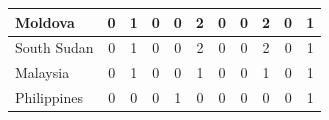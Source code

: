 \documentclass[12pt]{article}  %
\begin{document}
\begin{subappendices}
\begin{longtable}{|l|c|c|c|c|c|c|c|c|c|c|}
	\hline
	Moldova                                                        & 0                                                                      & 1                                                                      & 0                                                                      & 0                                                                      & 2                                                                      & 0                                                                      & 0                         & 2                           & 0                           & 1                           \\ 
	\hline
	South Sudan                                                    & 0                                                                      & 1                                                                      & 0                                                                      & 0                                                                      & 2                                                                      & 0                                                                      & 0                         & 2                           & 0                           & 1                           \\ 
	\hline
	Malaysia                                                       & 0                                                                      & 1                                                                      & 0                                                                      & 0                                                                      & 1                                                                      & 0                                                                      & 0                         & 1                           & 0                           & 1                           \\ 
	\hline
	Philippines                                                    & 0                                                                      & 0                                                                      & 0                                                                      & 1                                                                      & 0                                                                      & 0                                                                      & 0                         & 0                           & 0                           & 1                           \\ 

\end{longtable}
\end{subappendices}
\end{document}
